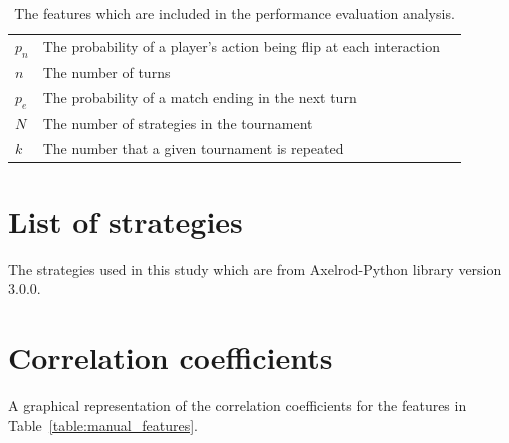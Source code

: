 \documentclass{article}
\begin{document}
\begin{table}[h]
\begin{center}
{\begin{tabular}{llc}
$p_n$                       & The probability of a player's action being flip at each interaction \\
$n$                         & The number of turns \\
$p_e$                       & The probability of a match ending in the next turn \\
$N$                         & The number of strategies in the tournament \\
$k$                         & The number that a given tournament is repeated \\
    \bottomrule
        \end{tabular}}
    \end{center}
    \caption{The features which are included in the performance evaluation analysis.}\label{table:parameters_summary}
\end{table}



\section{List of strategies}\label{app:list_of_players}

The strategies used in this study which are from Axelrod-Python library version 3.0.0.

\begin{multicols}{3}
	\begin{enumerate}
		
	\end{enumerate}
\end{multicols}


\section{Correlation coefficients}\label{app:correlations}

A graphical representation of the correlation coefficients for the features in
Table~\ref{table:manual_features}.
\end{document}
